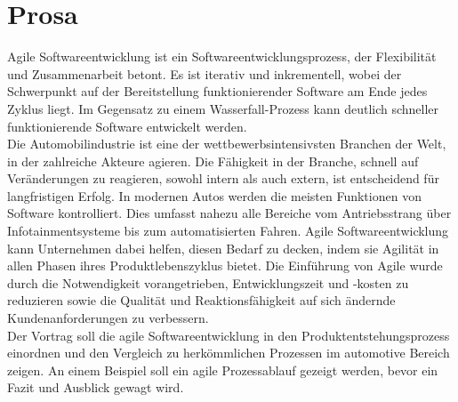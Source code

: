 \section{Prosa}\label{prosa}
Agile Softwareentwicklung ist ein Softwareentwicklungsprozess, der Flexibilität und Zusammenarbeit betont. Es ist iterativ und inkrementell, wobei der Schwerpunkt auf der Bereitstellung funktionierender Software am Ende jedes Zyklus liegt. Im Gegensatz zu einem Wasserfall-Prozess kann deutlich schneller funktionierende Software entwickelt werden.\\
Die Automobilindustrie ist eine der wettbewerbsintensivsten Branchen der Welt, in der zahlreiche Akteure agieren. Die Fähigkeit in der Branche, schnell auf Veränderungen zu reagieren, sowohl intern als auch extern, ist entscheidend für langfristigen Erfolg. In modernen Autos werden die meisten Funktionen von Software kontrolliert. Dies umfasst nahezu alle Bereiche vom Antriebsstrang über Infotainmentsysteme bis zum automatisierten Fahren. Agile Softwareentwicklung kann Unternehmen dabei helfen, diesen Bedarf zu decken, indem sie Agilität in allen Phasen ihres Produktlebenszyklus bietet. Die Einführung von Agile wurde durch die Notwendigkeit vorangetrieben, Entwicklungszeit und -kosten zu reduzieren sowie die Qualität und Reaktionsfähigkeit auf sich ändernde Kundenanforderungen zu verbessern. \cite{Schlosser2016} \cite{katumba2014}\\
Der Vortrag \glqq\titleDocument\grqq{} soll die agile Softwareentwicklung in den Produktentstehungsprozess einordnen und den Vergleich zu herkömmlichen Prozessen im automotive Bereich zeigen. An einem Beispiel soll ein agile Prozessablauf gezeigt werden, bevor ein Fazit und Ausblick gewagt wird.\\


